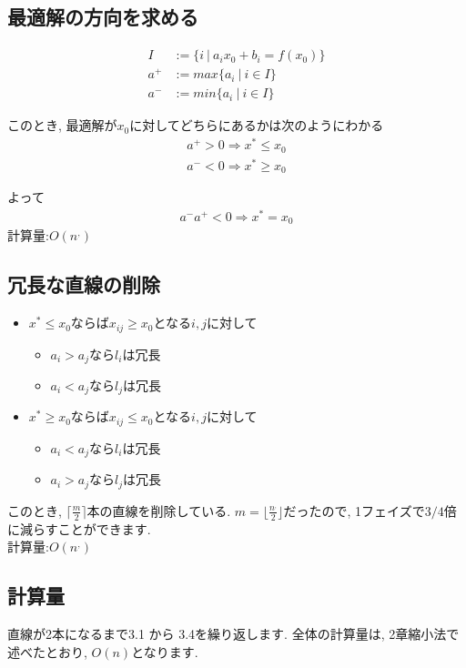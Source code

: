 \documentclass[dvipdfmx,12pt]{jsarticle}%
\begin{document}
\newpage
\subsection{最適解の方向を求める}
\begin{eqnarray*}
  I &:= \{i\:|\: a_ix_0 + b_i = f(x_0) \} \\
  a^+ &:= max\{ a_i\:|\:i\in I\} \\
  a^- &:= min\{ a_i\:|\:i\in I\} 
\end{eqnarray*}

このとき, 最適解が$x_0$に対してどちらにあるかは次のようにわかる
\begin{eqnarray*}
  a^+ > 0　\Rightarrow x^* \leq x_0 \\
  a^- < 0　\Rightarrow x^* \geq x_0 
\end{eqnarray*}

よって
\begin{eqnarray*}
  a^- a^+ < 0　\Rightarrow x^* = x_0 
\end{eqnarray*}
計算量:$O(n^{,})$


\subsection{冗長な直線の削除}
\begin{itemize}
  \item $x^* \leq x_0$ならば$x_{ij} \geq x_0$となる$i,j$に対して
  \begin{itemize}
    \item $a_i>a_j$なら$l_i$は冗長
    \item $a_i<a_j$なら$l_j$は冗長
  \end{itemize}
  \item $x^* \geq x_0$ならば$x_{ij} \leq x_0$となる$i,j$に対して
  \begin{itemize}
    \item $a_i<a_j$なら$l_i$は冗長
    \item $a_i>a_j$なら$l_j$は冗長
  \end{itemize}
\end{itemize}


このとき, $\lceil\frac{m}{2}\rceil$本の直線を削除している.
$m=\lfloor \frac{n^{,}}{2} \rfloor$だったので, 1フェイズで$3/4$倍に減らすことができます.\\
計算量:$O(n^{,})$


\subsection{計算量}
直線が2本になるまで3.1 から 3.4を繰り返します.
全体の計算量は, 2章縮小法で述べたとおり, $O(n)$となります.
\end{document}
